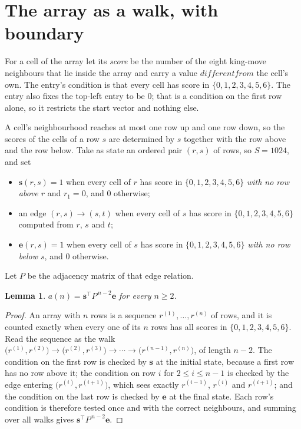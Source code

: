 \documentclass[11pt,a4paper]{article}
\theoremstyle{plain}
\newtheorem{lemma}[theorem]{Lemma}
\theoremstyle{definition}
\begin{document}
\section{The array as a walk, with boundary}

For a cell of the array let its \emph{score} be the number of the eight king-move neighbours that lie inside
the array and carry a value $different from$ the cell's own. The entry's condition is that every cell
has score in $\{0,1,2,3,4,5,6\}$. The entry also fixes the top-left entry to be $0$; that is a condition on the first row alone, so it restricts the start vector and nothing else.

A cell's neighbourhood reaches at most one row up and one row down, so the scores of the
cells of a row $s$ are determined by $s$ together with the row above and the row below.
Take as state an ordered pair $(r,s)$ of rows, so $S=1024$, and set
\begin{itemize}
\item $\mathbf{s}(r,s)=1$ when every cell of $r$ has score in $\{0,1,2,3,4,5,6\}$ \emph{with no row
above $r$} and $r_1=0$, and $0$ otherwise;
\item an edge $(r,s)\to(s,t)$ when every cell of $s$ has score in $\{0,1,2,3,4,5,6\}$ computed from
$r$, $s$ and $t$;
\item $\mathbf{e}(r,s)=1$ when every cell of $s$ has score in $\{0,1,2,3,4,5,6\}$ \emph{with no row
below $s$}, and $0$ otherwise.
\end{itemize}
Let $P$ be the adjacency matrix of that edge relation.

\begin{lemma}\label{lem:walk}
$a(n)=\mathbf{s}^{\!\top}P^{\,n-2}\mathbf{e}$ for every $n\ge2$.
\end{lemma}

\begin{proof}
An array with $n$ rows is a sequence $r^{(1)},\dots,r^{(n)}$ of rows, and it is counted
exactly when every one of its $n$ rows has all scores in $\{0,1,2,3,4,5,6\}$. Read the sequence as the
walk $\bigl(r^{(1)},r^{(2)}\bigr)\to\bigl(r^{(2)},r^{(3)}\bigr)\to\cdots\to
\bigl(r^{(n-1)},r^{(n)}\bigr)$, of length $n-2$. The condition on the first row is
checked by $\mathbf{s}$ at the initial state, because a first row has no row above it; the
condition on row $i$ for $2\le i\le n-1$ is checked by the edge entering
$\bigl(r^{(i)},r^{(i+1)}\bigr)$, which sees exactly $r^{(i-1)}$, $r^{(i)}$ and
$r^{(i+1)}$; and the condition on the last row is checked by $\mathbf{e}$ at the final
state. Each row's condition is therefore tested once and with the correct neighbours, and
summing over all walks gives $\mathbf{s}^{\!\top}P^{\,n-2}\mathbf{e}$.
\end{proof}
\end{document}
